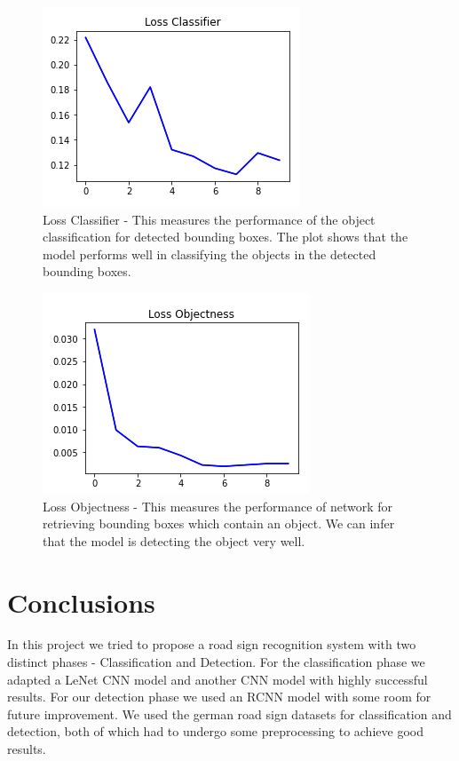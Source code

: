 \documentclass[12pt, landscape]{article}
\begin{document}
\begin{multicols}{3}
\begin{figure}[H]
    \centerline{\includegraphics[scale = 0.6]{lossclassifier.png}}
    \caption{Loss Classifier - This measures the performance of the object classification for detected bounding boxes. The plot shows that the model performs well in classifying the objects in the detected bounding boxes.}
    \label{fig:LossClassifier}
\end{figure}

\begin{figure}[H]
    \centerline{\includegraphics[scale = 0.6]{lossobjectness.png}}
    \caption{Loss Objectness - This measures the performance of network for retrieving bounding boxes which contain an object. We can infer that the model is detecting the object very well.}
    \label{fig:LossObjectness}
\end{figure}

\section{Conclusions}

In this project we tried to propose a road sign recognition system with two
distinct phases - Classification and Detection. For the classification phase we
adapted a LeNet CNN model and another CNN model with highly successful results.
For our detection phase we used an RCNN model with some room for future
improvement. We used the german road sign datasets for classification and
detection, both of which had to undergo some preprocessing to achieve good
results.


\end{multicols}
\end{document}
